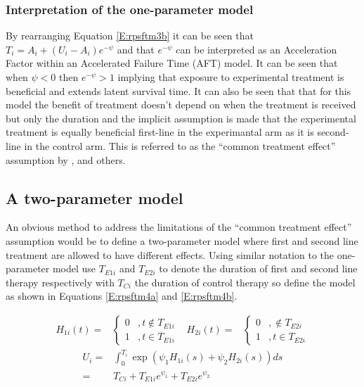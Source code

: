 \subsubsection{Interpretation of the one-parameter model}
By rearranging Equation \ref{E:rpsftm3b} it can be seen that $T_i = A_i + (U_i-A_i)e^{-\psi}$ and that $e^{-\psi}$ can be interpreted as an Acceleration Factor within an Accelerated Failure Time (AFT) model. It can be seen that when $\psi < 0$ then $e^{-\psi} > 1$ implying that exposure to experimental treatment is beneficial and extends latent survival time. It can also be seen that that for this model the benefit of treatment doesn't depend on when the treatment is received but only the duration and the implicit assumption is made that the experimental treatment is equally beneficial first-line in the experimantal arm as it is second-line in the control arm. This is referred to as the ``common treatment effect'' assumption by \cite{TSD16}, \cite{Watkins2013} and others. 

\subsection{A two-parameter model}
 An obvious method to address the limitations of the ``common treatment effect'' assumption would be to define a two-parameter model where first and second line treatment are allowed to have different effects. Using similar notation to the one-parameter model use $T_{E1i}$ and $T_{E2i}$ to denote the duration of first and second line therapy respectively with $T_{Ci}$ the duration of control therapy so define the model as shown in Equations \ref{E:rpsftm4a} and \ref{E:rpsftm4b}.
 
 \begin{align}
 H_{1i}(t)=& \begin{cases}        
	0 &, t \not\in T_{E1i} \\ 
    1 &, t \in T_{E1i}
    \end{cases}                
    &  
 H_{2i}(t)=& \begin{cases}        
	0 &, \not\in T_{E2i} \\ 
    1 &, t \in T_{E2i}
    \end{cases}                
                \label{E:rpsftm4a}
\end{align}                
\begin{align}
U_i =& \int_0^{T_i} \exp\left(\psi_1 H_{1i}(s) + \psi_2 H_{2i}(s) \right) ds \nonumber  \\
    =& T_{Ci} + T_{E1i} e^{\psi_1} + T_{E2i} e^{\psi_2} \label{E:rpsftm4b}
\end{align}

